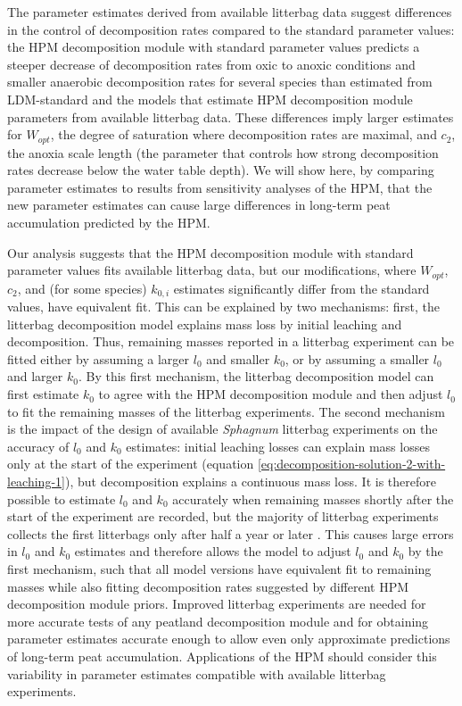 \documentclass[esd, manuscript]{copernicus}
\begin{document}
The parameter estimates derived from available litterbag data suggest differences in the control of decomposition rates compared to the standard parameter values: the HPM decomposition module with standard parameter values predicts a steeper decrease of decomposition rates from oxic to anoxic conditions and smaller anaerobic decomposition rates for several species than estimated from LDM-standard and the models that estimate HPM decomposition module parameters from available litterbag data. These differences imply larger estimates for \(W_{opt}\), the degree of saturation where decomposition rates are maximal, and \(c_2\), the anoxia scale length (the parameter that controls how strong decomposition rates decrease below the water table depth). We will show here, by comparing parameter estimates to results from sensitivity analyses of the HPM, that the new parameter estimates can cause large differences in long-term peat accumulation predicted by the HPM.

Our analysis suggests that the HPM decomposition module with standard parameter values fits available litterbag data, but our modifications, where \(W_{opt}\), \(c_2\), and (for some species) \(k_{0,i}\) estimates significantly differ from the standard values, have equivalent fit. This can be explained by two mechanisms: first, the litterbag decomposition model explains mass loss by initial leaching and decomposition. Thus, remaining masses reported in a litterbag experiment can be fitted either by assuming a larger \(l_0\) and smaller \(k_0\), or by assuming a smaller \(l_0\) and larger \(k_0\). By this first mechanism, the litterbag decomposition model can first estimate \(k_0\) to agree with the HPM decomposition module and then adjust \(l_0\) to fit the remaining masses of the litterbag experiments. The second mechanism is the impact of the design of available \emph{Sphagnum} litterbag experiments on the accuracy of \(l_0\) and \(k_0\) estimates: initial leaching losses can explain mass losses only at the start of the experiment (equation \eqref{eq:decomposition-solution-2-with-leaching-1}), but decomposition explains a continuous mass loss. It is therefore possible to estimate \(l_0\) and \(k_0\) accurately when remaining masses shortly after the start of the experiment are recorded, but the majority of litterbag experiments collects the first litterbags only after half a year or later \citep{Teickner.2025}. This causes large errors in \(l_0\) and \(k_0\) estimates and therefore allows the model to adjust \(l_0\) and \(k_0\) by the first mechanism, such that all model versions have equivalent fit to remaining masses while also fitting decomposition rates suggested by different HPM decomposition module priors. Improved litterbag experiments are needed for more accurate tests of any peatland decomposition module and for obtaining parameter estimates accurate enough to allow even only approximate predictions of long-term peat accumulation. Applications of the HPM should consider this variability in parameter estimates compatible with available litterbag experiments.
\end{document}
